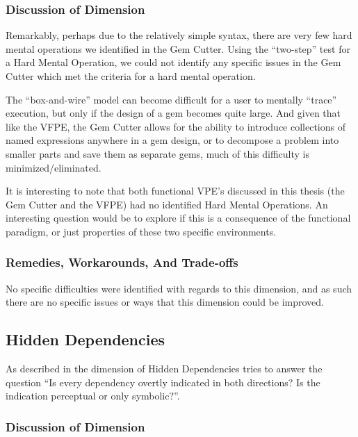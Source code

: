 \subsubsection{Discussion of Dimension}

Remarkably, perhaps due to the relatively simple syntax, there are very few hard mental operations we identified in the Gem Cutter.  Using the ``two-step'' test for a Hard Mental Operation, we could not identify any specific issues in the Gem Cutter which met the criteria for a hard mental operation.  

The ``box-and-wire'' model can become difficult for a user to mentally ``trace'' execution, but only if the design of a gem becomes quite large.  And given that like the VFPE, the Gem Cutter allows for the ability to introduce collections of named expressions anywhere in a gem design, or to decompose a problem into smaller parts and save them as separate gems, much of this difficulty is minimized/eliminated.

It is interesting to note that both functional VPE's discussed in this thesis (the Gem Cutter and the VFPE) had no identified Hard Mental Operations.  An interesting question would be to explore if this is a consequence of the functional paradigm, or just properties of these two specific environments.

\subsubsection{Remedies, Workarounds, And Trade-offs}

No specific difficulties were identified with regards to this dimension, and as such there are no specific issues or ways that this dimension could be improved.


\subsection{Hidden Dependencies}

As described in  the dimension of Hidden Dependencies tries to answer the question ``Is every dependency overtly indicated in both directions? Is the indication perceptual or only symbolic?''.

\subsubsection{Discussion of Dimension}

